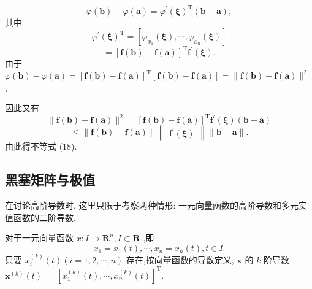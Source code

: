 \[
\varphi \left( \mathbf{b}\right)  - \varphi \left( \mathbf{a}\right)  = {\varphi }^{\prime }{\left( \mathbf{\xi }\right) }^{\mathrm{T}}\left( {\mathbf{b} - \mathbf{a}}\right) ,
\]
其中
\[
{\varphi }^{\prime }{\left( \mathbf{\xi }\right) }^{\mathrm{T}} = \left\lbrack  {{\varphi }_{{x}_{1}}\left( \mathbf{\xi }\right) ,\cdots ,{\varphi }_{{x}_{n}}\left( \mathbf{\xi }\right) }\right\rbrack
\]
\[
= {\left\lbrack  \mathbf{f}\left( \mathbf{b}\right)  - \mathbf{f}\left( \mathbf{a}\right) \right\rbrack  }^{\mathrm{T}}{\mathbf{f}}^{\prime }\left( \mathbf{\xi }\right) .
\]
由于 \(\varphi \left( \mathbf{b}\right)  - \varphi \left( \mathbf{a}\right)  = {\left\lbrack  \mathbf{f}\left( \mathbf{b}\right)  - \mathbf{f}\left( \mathbf{a}\right) \right\rbrack  }^{\mathrm{T}}\left\lbrack  {\mathbf{f}\left( \mathbf{b}\right)  - \mathbf{f}\left( \mathbf{a}\right) }\right\rbrack   = \parallel \mathbf{f}\left( \mathbf{b}\right)  - \mathbf{f}\left( \mathbf{a}\right) {\parallel }^{2}\) ,

因此又有
\[
\parallel \mathbf{f}\left( \mathbf{b}\right)  - \mathbf{f}\left( \mathbf{a}\right) {\parallel }^{2} = {\left\lbrack  \mathbf{f}\left( \mathbf{b}\right)  - \mathbf{f}\left( \mathbf{a}\right) \right\rbrack  }^{\mathrm{T}}{\mathbf{f}}^{\prime }\left( \mathbf{\xi }\right) \left( {\mathbf{b} - \mathbf{a}}\right)
\]
\[
\leq  \parallel \mathbf{f}\left( \mathbf{b}\right)  - \mathbf{f}\left( \mathbf{a}\right) \parallel \begin{Vmatrix}{{\mathbf{f}}^{\prime }\left( \mathbf{\xi }\right) }\end{Vmatrix}\parallel \mathbf{b} - \mathbf{a}\parallel .
\]
由此得不等式 (18).

\subsection{黑塞矩阵与极值}

在讨论高阶导数时, 这里只限于考察两种情形: 一元向量函数的高阶导数和多元实值函数的二阶导数.

对于一元向量函数 \(x : I \rightarrow  {\mathbf{R}}^{n},I \subset  \mathbf{R}\) ,即
\[
{x}_{1} = {x}_{1}\left( t\right) ,\cdots ,{x}_{n} = {x}_{n}\left( t\right) ,t \in  I.
\]
只要 \({x}_{i}^{\left( k\right) }\left( t\right) \left( {i = 1,2,\cdots ,n}\right)\) 存在,按向量函数的导数定义, \(\mathbf{x}\) 的 \(k\) 阶导数 \({\mathbf{x}}^{\left( k\right) }\left( t\right)  =\)  \({\left\lbrack  {x}_{1}^{\left( k\right) }\left( t\right) ,\cdots ,{x}_{n}^{\left( k\right) }\left( t\right) \right\rbrack  }^{\mathrm{T}}.\)


